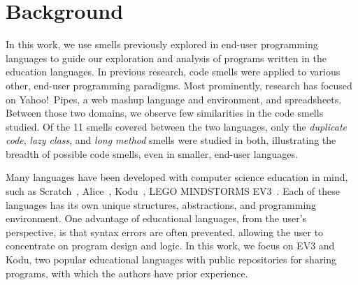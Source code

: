 \documentclass[conference]{IEEEtran}
\newcommand{\ms}{LEGO MINDSTORMS EV3}
\begin{document}
\section{Background}
\label{sec:background}
In this work, we use smells previously explored in end-user programming languages to guide our exploration and analysis of programs written in the education languages. 
In previous research, code smells were applied to various other, end-user programming paradigms. 
Most prominently, research has focused on Yahoo!\ Pipes, a web mashup language and environment, and spreadsheets. Between those two domains, we observe few similarities in the code smells studied. Of the 11 smells covered between the two languages, only the \emph{duplicate code}, \emph{lazy class}, and \emph{long method} smells  were studied in both, illustrating the breadth of  possible code smells, even in smaller, end-user languages.  

%
 


Many languages have been developed with computer science education in mind, such as Scratch~\cite{scratch}, Alice~\cite{aliceIntro}, Kodu~\cite{kodugrammar}, \ms~\cite{lego}. Each of these languages has its own unique structures, abstractions, and programming environment. One advantage of
educational languages, from the user's perspective, is that syntax errors are often prevented, allowing the user to concentrate on program design and logic. In this work, we focus on EV3 and Kodu, two popular educational languages with public repositories for sharing programs, with which the authors have prior experience. 
\end{document}

